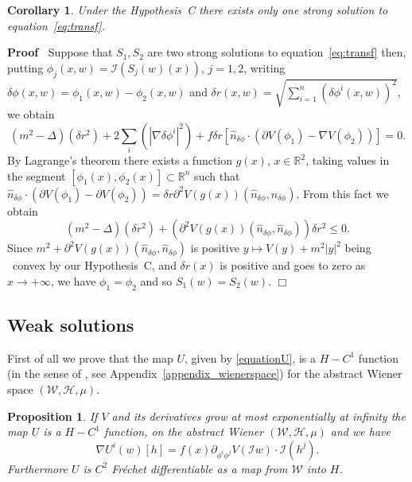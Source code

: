 \documentclass[a4paper,10pt]{article}
\newenvironment{proof}{\noindent\textbf{Proof\ }}{\hspace*{\fill}$\Box$\medskip}
\newtheorem{corollary}{Corollary}
\newtheorem{proposition}{Proposition}
{\theorembodyfont{\rmfamily}\newtheorem{remark}{Remark}}
\begin{document}
\begin{corollary}
  \label{corollary_uniqueness1}Under the Hypothesis~C there exists only one
  strong solution to equation~{\eqref{eq:transf}}.
\end{corollary}

\begin{proof}
  Suppose that $S_1, S_2$ are two strong solutions to
  equation~{\eqref{eq:transf}} then, putting $\phi_j (x, w) =\mathcal{I} (S_j
  (w) (x))$, $j = 1, 2$, writing $\delta \phi (x, w) = \phi_1 (x, w) - \phi_2
  (x, w)$ and $\delta r (x, w) = \sqrt{\sum_{i = 1}^n (\delta \phi^i (x,
  w))^2}$, we obtain
  \[ (m^2 - \Delta) (\delta r^2) + 2 \sum_i (| \nabla \delta \phi^i |^2) + f
     \delta r [\hat{n}_{\delta \phi} \cdot (\partial V (\phi_1) - \nabla V
     (\phi_2))] = 0. \]
  By Lagrange's theorem there exists a function $g (x)$, $x \in \mathbb{R}^2$,
  taking values in the segment $[\phi_1 (x), \phi_2 (x)] \subset \mathbb{R}^n$
  such that $\hat{n}_{\delta \phi} \cdot (\partial V (\phi_1) - \partial V
  (\phi_2)) = \delta r \partial^2 V (g (x)) (\hat{n}_{\delta \phi},
  \hat{n}_{\delta \phi})$. From this fact we obtain
  \[ (m^2 - \Delta) (\delta r^2) + (\partial^2 V (g (x)) (\hat{n}_{\delta
     \phi}, \hat{n}_{\delta \phi})) \delta r^2 \leqslant 0. \]
  Since $m^2 + \partial^2 V (g (x)) (\hat{n}_{\delta \phi}, \hat{n}_{\delta
  \phi})$ is positive $y \mapsto V (y) + m^2 | y |^2$ being \ convex by our
  Hypothesis~C, and $\delta r (x)$ is positive and goes to zero as $x
  \rightarrow + \infty$, we have $\phi_1 = \phi_2$ and so $S_1 (w) = S_2 (w)$.
\end{proof}

\subsection{Weak solutions}

First of all we prove that the map $U$, given by {\eqref{equationU}}, is a $H
- C^1$ function (in the sense of {\cite{Ustunel2000}}, see
Appendix~\ref{appendix_wienerspace}) for the abstract Wiener space
$(\mathcal{W}, \mathcal{H}, \mu)$.

\begin{proposition}
  \label{proposition_C1H}If $V$ and its derivatives grow at most exponentially
  at infinity the map $U$ is a $H - C^1$ function, on the abstract Wiener
  $(\mathcal{W}, \mathcal{H}, \mu)$ and we have
  \[ \nabla U^i (w) [h] = f (x) \partial_{\phi^i \phi^j} V (\mathcal{I}w)
     \cdot \mathcal{I} (h^j) . \]
  Furthermore $U$ is $C^2$ Fr{\'e}chet differentiable as a map from
  $\mathcal{W}$ into $H$.
\end{proposition}
\end{document}
